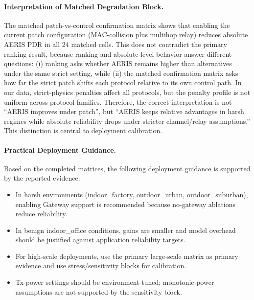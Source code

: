 ﻿\documentclass[sensors,article,submit,moreauthors,pdftex]{Definitions/mdpi}
\begin{document}
\paragraph{Interpretation of Matched Degradation Block.}
The matched patch-vs-control confirmation matrix shows that enabling the current patch configuration (MAC-collision plus multihop relay) reduces absolute AERIS PDR in all 24 matched cells. This does not contradict the primary ranking result, because ranking and absolute-level behavior answer different questions: (i) ranking asks whether AERIS remains higher than alternatives under the same strict setting, while (ii) the matched confirmation matrix asks how far the strict patch shifts each protocol relative to its own control path. In our data, strict-physics penalties affect all protocols, but the penalty profile is not uniform across protocol families. Therefore, the correct interpretation is not ``AERIS improves under patch'', but ``AERIS keeps relative advantages in harsh regimes while absolute reliability drops under stricter channel/relay assumptions.'' This distinction is central to deployment calibration.

\paragraph{Practical Deployment Guidance.}
Based on the completed matrices, the following deployment guidance is supported by the reported evidence:
\begin{itemize}
\item In harsh environments (indoor\_factory, outdoor\_urban, outdoor\_suburban), enabling Gateway support is recommended because no-gateway ablations reduce reliability.
\item In benign indoor\_office conditions, gains are smaller and model overhead should be justified against application reliability targets.
\item For high-scale deployments, use the primary large-scale matrix as primary evidence and use stress/sensitivity blocks for calibration.
\item Tx-power settings should be environment-tuned; monotonic power assumptions are not supported by the sensitivity block.
\end{itemize}
\end{document}
